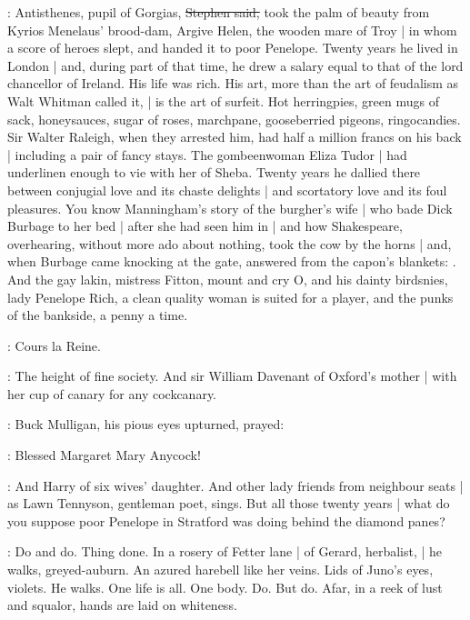 \Stephen:
Antisthenes, pupil of Gorgias,
\sout{Stephen said,}
took the palm of beauty from Kyrios Menelaus' brood-dam,
Argive Helen, the wooden mare of Troy |
in whom a score of heroes slept,
and handed it to poor Penelope.
Twenty years he lived in London |
and, during part of that time,
he drew a salary equal to that of the lord chancellor of Ireland.
His life was rich.
His art,
more than the art of feudalism as Walt Whitman called it, |
is the art of surfeit.
Hot herringpies,
green mugs of sack,
honeysauces,
sugar of roses,
marchpane,
gooseberried pigeons,
ringocandies.
Sir Walter Raleigh,
when they arrested him,
had half a million francs on his back |
including a pair of fancy stays.
The gombeenwoman Eliza Tudor |
had underlinen enough to vie with her of Sheba.
Twenty years he dallied there between conjugial love and its chaste delights |
and scortatory love and its foul pleasures.
You know Manningham's story of the burgher's wife |
who bade Dick Burbage to her bed |
after she had seen him in  |
and how Shakespeare,
overhearing,
without more ado about nothing,
took the cow by the horns |
and, when Burbage came knocking at the gate,
answered from the capon's blankets:
.
And the gay lakin,
mistress Fitton,
mount and cry O,
and his dainty birdsnies,
lady Penelope Rich,
a clean quality woman is suited for a player,
and the punks of the bankside,
a penny a time.

\StephenInt:
Cours la Reine.

\Stephen:
The height of fine society.
And sir William Davenant of Oxford's mother |
with her cup of canary for any cockcanary.

:
Buck Mulligan,
his pious eyes upturned,
prayed:

\mulligan:
Blessed Margaret Mary Anycock!

\Stephen:
And Harry of six wives' daughter.
And other lady friends from neighbour seats |
as Lawn Tennyson, gentleman poet, sings.
But all those twenty years |
what do you suppose poor Penelope in Stratford was doing
behind the diamond panes?

\StephenInt:
Do and do.
Thing done.
In a rosery of Fetter lane |
of Gerard, herbalist, |
he walks, greyed-auburn.
An azured harebell like her veins.
Lids of Juno's eyes, violets.
He walks.
One life is all.
One body.
Do.
But do.
Afar,
in a reek of lust and squalor,
hands are laid on whiteness.

